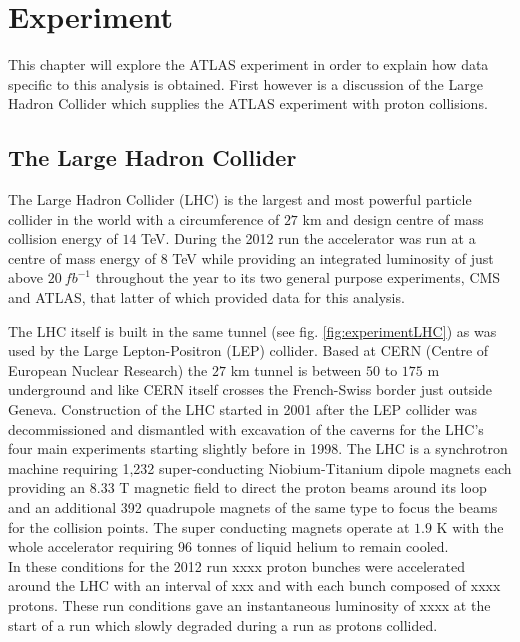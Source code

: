 \chapter{Experiment}

	This chapter will explore the ATLAS experiment in order to explain how data specific to this analysis is obtained. First however is a discussion of the Large Hadron Collider which supplies the ATLAS experiment with proton collisions.

\section{The Large Hadron Collider}

	The Large Hadron Collider (LHC) \cite{Brüning:782076} is the largest and most powerful particle collider in the world with a circumference of $27$ km and design centre of mass collision energy of $14$ TeV. During the 2012 run the accelerator was run at a centre of mass energy of $8$ TeV while providing an integrated luminosity of just above $20~fb^{-1}$ throughout the year to its two general purpose experiments, CMS and ATLAS, that latter of which provided data for this analysis.
	
	The LHC itself is built in the same tunnel (see fig. \ref{fig:experimentLHC}) as was used by the Large Lepton-Positron (LEP) collider. Based at CERN (Centre of European Nuclear Research) the $27$ km tunnel is between $50$ to $175$ m underground and like CERN itself crosses the French-Swiss border just outside Geneva. Construction of the LHC started in 2001 after the LEP collider was decommissioned and dismantled with excavation of the caverns for the LHC's four main experiments starting slightly before in 1998. 
	The LHC is a synchrotron machine requiring 1,232 super-conducting Niobium-Titanium dipole magnets each providing an $8.33$ T magnetic field to direct the proton beams around its loop and an additional 392 quadrupole magnets of the same type to focus the beams for the collision points. The super conducting magnets operate at $1.9$ K with the whole accelerator requiring 96 tonnes of liquid helium to remain cooled.\\

	In these conditions for the 2012 run xxxx proton bunches were accelerated around the LHC with an interval of xxx and with each bunch composed of xxxx protons. These run conditions gave an instantaneous luminosity of xxxx at the start of a run which slowly degraded during a run as protons collided. %

